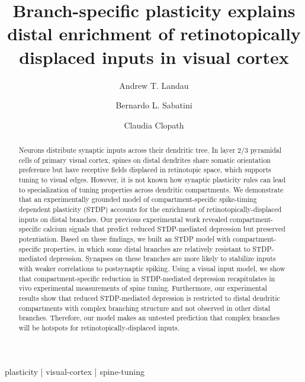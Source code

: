 
\title{Branch-specific plasticity explains distal enrichment of retinotopically displaced inputs in visual cortex}

\author[1,\Letter]{Andrew T. Landau }
\author[2]{Bernardo L. Sabatini }
\author[3]{Claudia Clopath }
\date{}

\maketitle

\begin{abstract}
Neurons distribute synaptic inputs across their dendritic tree. In layer 2/3 pyramidal cells of primary visual cortex, spines on distal dendrites share somatic orientation preference but have receptive fields displaced in retinotopic space, which supports tuning to visual edges. However, it is not known how synaptic plasticity rules can lead to specialization of tuning properties across dendritic compartments. We demonstrate that an experimentally grounded model of compartment-specific spike-timing dependent plasticity (STDP) accounts for the enrichment of retinotopically-displaced inputs on distal branches. Our previous experimental work revealed compartment-specific calcium signals that predict reduced STDP-mediated depression but preserved potentiation. Based on these findings, we built an STDP model with compartment-specific properties, in which some distal branches are relatively resistant to STDP-mediated depression. Synapses on these branches are more likely to stabilize inputs with weaker correlations to postsynaptic spiking. Using a visual input model, we show that compartment-specific reduction in STDP-mediated depression recapitulates in vivo experimental measurements of spine tuning. Furthermore, our experimental results show that reduced STDP-mediated depression is restricted to distal dendritic compartments with complex branching structure and not observed in other distal branches. Therefore, our model makes an untested prediction that complex branches will be hotspots for retinotopically-displaced inputs. 
\end{abstract}

\begin{keywords}
plasticity | visual-cortex | spine-tuning
\end{keywords}

